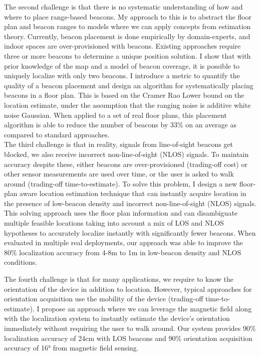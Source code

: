 \documentclass[10pt]{article}
\begin{document}
The second challenge is that there is no systematic understanding of how and where to place range-based beacons. My approach to this is to abstract the floor plan and beacon ranges to models where we can apply concepts from estimation theory. Currently, beacon placement is done empirically by domain-experts, and indoor spaces are over-provisioned with beacons. Existing approaches require three or more beacons to determine a unique position solution. I show that with prior knowledge of the map and a model of beacon coverage, it is possible to uniquely localize with only two beacons. I introduce a metric to quantify the quality of a beacon placement and design an algorithm for systematically placing beacons in a floor plan. This is based on the Cramer Rao Lower bound on the location estimate, under the assumption that the ranging noise is additive white noise Gaussian. When applied to a set of real floor plans, this placement algorithm is able to reduce the number of beacons by 33\% on an average as compared to standard approaches. \\

The third challenge is that in reality, signals from line-of-sight beacons get blocked, we also receive incorrect non-line-of-sight (NLOS) signals. To maintain accuracy despite these, either beacons are over-provisioned (trading-off cost) or other sensor measurements are used over time, or the user is asked to walk around (trading-off time-to-estimate). To solve this problem, I design a new floor-plan aware location estimation technique that can instantly acquire location  
in the presence of low-beacon density and incorrect non-line-of-sight (NLOS) signals. 
This solving approach uses the floor plan information and can disambiguate multiple feasible locations taking into account a mix of LOS and NLOS hypotheses to accurately localize instantly with significantly fewer beacons. When evaluated in multiple real deployments, our approach was able to improve the 80\% localization accuracy from 4-8m to 1m in low-beacon density and NLOS conditions.

The fourth challenge is that for many applications, we require to know the orientation of the device in addition to location. However, 
typical approaches for orientation acquisition use the mobility of the device (trading-off time-to-estimate). I propose an approach where we can leverage the magnetic field along with the localization system to 
instantly estimate the device’s orientation immediately without requiring the user to walk around. Our system provides 90\% localization accuracy of 24cm with LOS beacons and 90\% orientation acquisition accuracy of 16° from magnetic field sensing.\\
\end{document}

